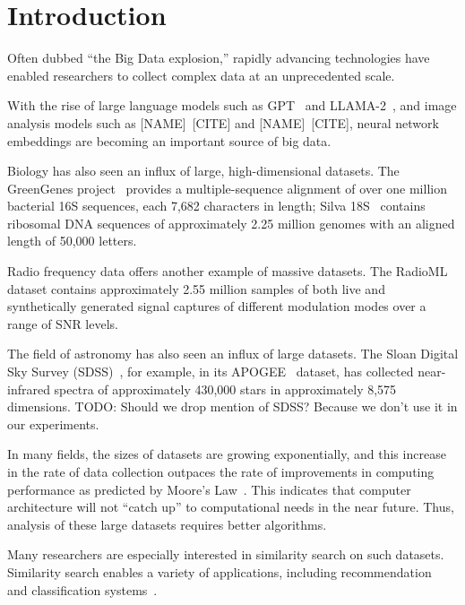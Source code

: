 \section{Introduction}
\label{sec:introduction}

Often dubbed ``the Big Data explosion,'' rapidly advancing technologies have enabled researchers to collect complex data at an unprecedented scale. 

With the rise of large language models such as GPT~\cite{2020arXiv200514165B, OpenAI2023GPT4TR} and LLAMA-2~\cite{Touvron2023Llama2O}, and image analysis models such as {\color{red} [NAME]~[CITE] and [NAME]~[CITE]}, neural network embeddings are becoming an important source of big data.

Biology has also seen an influx of large, high-dimensional datasets.
The GreenGenes project~\cite{desantis2006greengenes} provides a multiple-sequence alignment of over one million bacterial 16S sequences, each 7,682 characters in length;
Silva 18S~\cite{10.1093/nar/gks1219} contains ribosomal DNA sequences of approximately 2.25 million genomes with an aligned length of 50,000 letters.

Radio frequency data offers another example of massive datasets. 
The RadioML~\cite{oshea2018radioml} dataset contains approximately 2.55 million samples of both live and synthetically generated signal captures of different modulation modes over a range of SNR levels.

The field of astronomy has also seen an influx of large datasets.
The Sloan Digital Sky Survey (SDSS)~\cite{blanton2017sdss}, for example, in its APOGEE~\cite{alam2015eleventh} dataset, has collected near-infrared spectra of approximately 430,000 stars in approximately 8,575 dimensions.
{\color{red} TODO: Should we drop mention of SDSS? Because we don't use it in our experiments.}

In many fields, the sizes of datasets are growing exponentially, and this increase in the rate of data collection outpaces the rate of improvements in computing performance as predicted by Moore's Law~\cite{brescia2012extracting}.
This indicates that computer architecture will not ``catch up'' to computational needs in the near future.
Thus, analysis of these large datasets requires better algorithms.

Many researchers are especially interested in similarity search on such datasets. 
Similarity search enables a variety of applications, including recommendation~\cite{annoy} and classification systems~\cite{suyanto2022knnclassifier}. 

